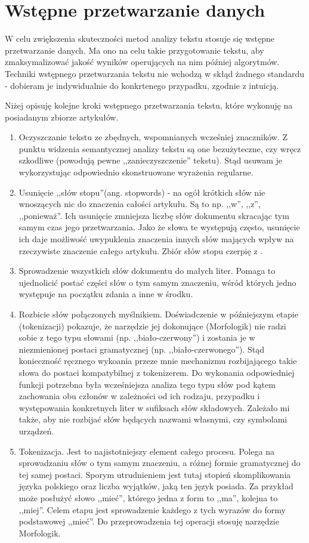 \documentclass[pl]{minipw} %
\begin{document}
\section{Wstępne przetwarzanie danych}

W celu zwiększenia skuteczności metod analizy tekstu stosuje się wstępne przetwarzanie danych. Ma ono na celu takie przygotowanie tekstu, aby zmaksymalizować jakość wyników operujących na nim później algorytmów. Techniki wstępnego przetwarzania tekstu nie wchodzą w skłąd żadnego standardu - dobieram je indywidualnie do konkrtenego przypadku, zgodnie z intuicją.

Niżej opisuję kolejne kroki wstępnego przetwarzania tekstu, które wykonuję na posiadanym zbiorze artykułów.
\begin{enumerate}
	\item Oczyszczanie tekstu ze zbędnych, wspomnianych wcześniej znaczników. Z punktu widzenia semantycznej analizy tekstu są one bezużyteczne, czy wręcz szkodliwe (powodują pewne ,,zanieczyszczenie'' tekstu). Stąd usuwam je wykorzystując odpowiednio skonstruowane wyrażenia regularne.
	\item Usunięcie ,,słów stopu''(ang. stopwords) - na ogół krótkich słów nie wnoszących nic do znaczenia całości artykułu. Są to np. ,,w'', ,,z'', ,,ponieważ''. Ich usunięcie zmniejsza liczbę słów dokumentu skracając tym samym czas jego przetwarzania. Jako że słowa te występują często, usunięcie ich daje możliwość uwypuklenia znaczenia innych słów mających wpływ na rzeczywiste znaczenie całego artykułu. Zbiór słów stopu czerpię z \cite{stopwords}.
	\item Sprowadzenie wszystkich słów dokumentu do małych liter. Pomaga to ujednolicić postać części słów o tym samym znaczeniu, wśród których jedno występuje na początku zdania a inne w środku.
	\item Rozbicie słów połączonych myślnikiem. Doświadczenie w późniejszym etapie (tokenizacji) pokazuje, że narzędzie jej dokonujące (Morfologik\cite{morfologik}) nie radzi sobie z tego typu słowami (np. ,,biało-czerwony'') i zostania je w niezmienionej postaci gramatycznej (np. ,,biało-czerwonego''). Stąd konieczność ręcznego wykoania przeze mnie mechanizmu rozbijającego takie słowa do postaci kompatybilnej z tokenizerem. Do wykonania odpowiedniej funkcji potrzebna była wcześniejsza analiza tego typu słów pod kątem zachowania obu członów w zależności od ich rodzaju, przypadku i występowania konkretnych liter w sufiksach słów składowych. Zależało mi także, aby nie rozbijać słów będących nazwami własnymi, czy symbolami urządzeń.
	\item Tokenizacja. Jest to najistotniejszy element całego procesu. Polega na sprowadzaniu słów o tym samym znaczeniu, a różnej formie gramatycznej do tej samej postaci. Sporym utrudnieniem jest tutaj stopień skomplikowania języka polskiego oraz liczba wyjątków, jaką ten język posiada. Za przykład może posłużyć słowo ,,mieć'', którego jedna z form to ,,ma'', kolejna to ,,miej''. Celem etapu jest sprowadzenie każdego z tych wyrazów do formy podstawowej ,,mieć''. Do przeprowadzenia tej operacji stosuję narzędzie Morfologik\cite{morfologik}.
\end{enumerate}
\end{document}

